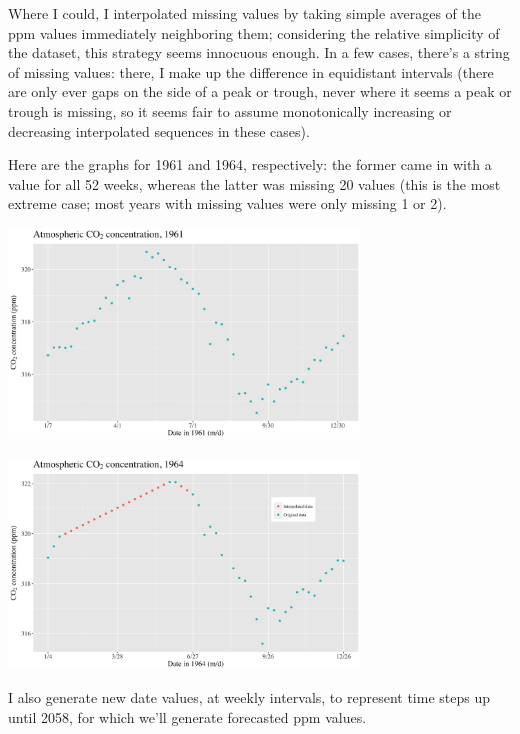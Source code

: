 \documentclass[]{article}
\let\origfigure=\figure
\let\endorigfigure=\endfigure
\renewenvironment{figure}[1][]{%
  \origfigure[H]
}{%
  \endorigfigure
}
\begin{document}
Where I could, I interpolated missing values by taking simple averages
of the ppm values immediately neighboring them; considering the relative
simplicity of the dataset, this strategy seems innocuous enough. In a
few cases, there's a string of missing values: there, I make up the
difference in equidistant intervals (there are only ever gaps on the
side of a peak or trough, never where it seems a peak or trough is
missing, so it seems fair to assume monotonically increasing or
decreasing interpolated sequences in these cases). \newline

Here are the graphs for 1961 and 1964, respectively: the former came in
with a value for all 52 weeks, whereas the latter was missing 20 values
(this is the most extreme case; most years with missing values were only
missing 1 or 2). \newline

\begin{figure}
\centering
\includegraphics[width=0.7\textwidth]{mauna_loa/1961.png}
\caption{One year of data}
\end{figure}

\begin{figure}
\centering
\includegraphics[width=0.7\textwidth]{mauna_loa/1964.png}
\caption{One year of data, with interpolations}
\end{figure}

I also generate new date values, at weekly intervals, to represent time
steps up until 2058, for which we'll generate forecasted ppm values.
\newline
\end{document}

